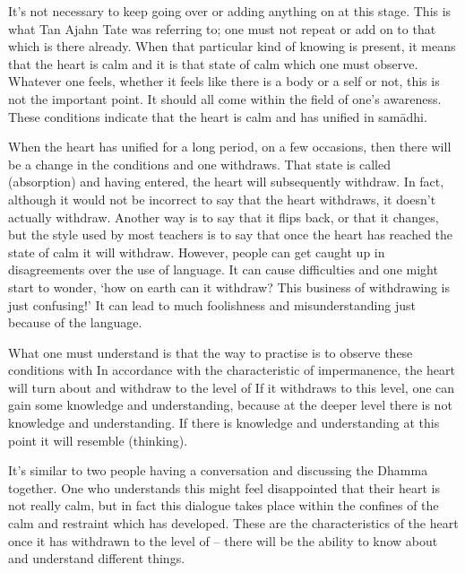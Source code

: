  It's not necessary to keep going over or adding anything on at this stage. This is what Tan Ajahn Tate was referring to; one must not repeat or add on to that which is there already. When that particular kind of knowing is present, it means that the heart is calm and it is that state of calm which one must observe. Whatever one feels, whether it feels like there is a body or a self or not, this is not the important point. It should all come within the field of one's awareness. These conditions indicate that the heart is calm and has unified in sam\=adhi.

When the heart has unified for a long period, on a few occasions, then there will be a change in the conditions and one withdraws.  That state is called  (absorption) and having entered, the heart will subsequently withdraw.  In fact, although it would not be incorrect to say that the heart withdraws, it doesn't actually withdraw. Another way is to say that it flips back, or that it changes, but the style used by most teachers is to say that once the heart has reached the state of calm it will withdraw. However, people can get caught up in disagreements over the use of language. It can cause difficulties and one might start to wonder, `how on earth can it withdraw? This business of withdrawing is just confusing!'  It can lead to much foolishness and misunderstanding just because of the language.

What one must understand is that the way to practise is to observe these conditions with  In accordance with the characteristic of impermanence, the heart will turn about and withdraw to the level of  If it withdraws to this level, one can gain some knowledge and understanding, because at the deeper level there is not knowledge and understanding.  If there is knowledge and understanding at this point it will resemble  (thinking).

It's similar to two people having a conversation and discussing the Dhamma together. One who understands this might feel disappointed that their heart is not really calm, but in fact this dialogue takes place within the confines of the calm and restraint which has developed. These are the characteristics of the heart once it has withdrawn to the level of  -- there will be the ability to know about and understand different things.

